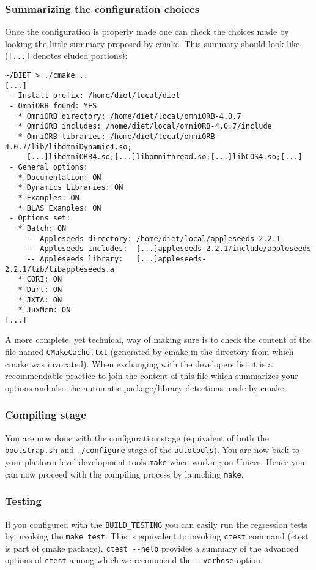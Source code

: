 \subsubsection{Summarizing the configuration choices}
Once the configuration is properly made one can check the choices made
by looking the little summary proposed by cmake.  This summary should
look like (\verb+[...]+ denotes eluded portions): {\footnotesize
\begin{verbatim}
~/DIET > ./cmake ..
[...]
 - Install prefix: /home/diet/local/diet
 - OmniORB found: YES
   * OmniORB directory: /home/diet/local/omniORB-4.0.7
   * OmniORB includes: /home/diet/local/omniORB-4.0.7/include
   * OmniORB libraries: /home/diet/local/omniORB-4.0.7/lib/libomniDynamic4.so;
     [...]libomniORB4.so;[...]libomnithread.so;[...]libCOS4.so;[...]
 - General options:
   * Documentation: ON
   * Dynamics Libraries: ON
   * Examples: ON
   * BLAS Examples: ON
 - Options set:
   * Batch: ON
     -- Appleseeds directory: /home/diet/local/appleseeds-2.2.1
     -- Appleseeds includes:  [...]appleseeds-2.2.1/include/appleseeds
     -- Appleseeds library:   [...]appleseeds-2.2.1/lib/libappleseeds.a
   * CORI: ON
   * Dart: ON
   * JXTA: ON
   * JuxMem: ON
[...]
\end{verbatim}
} A more complete, yet technical, way of making sure is to check the
content of the file named \verb+CMakeCache.txt+ (generated by cmake in
the directory from which cmake was invocated). When exchanging with
the developers list it is a recommendable practice to join the content
of this file which summarizes your options and also the automatic
package/library detections made by cmake.

\subsubsection{Compiling stage}
You are now done with the configuration stage (equivalent of both the
\verb+bootstrap.sh+ and \verb+./configure+ stage of the
\verb+autotools+).  You are now back to your platform level
development tools \ie \verb+make+ when working on Unices. Hence you
can now proceed with the compiling process by launching \verb+make+.

\subsubsection{Testing}
If you configured \diet with the \verb+BUILD_TESTING+ you can easily
run the regression tests by invoking the \verb+make test+. This is
equivalent to invoking \verb+ctest+ command (ctest is part of cmake
package). \verb+ctest --help+ provides a summary of the advanced
options of \verb+ctest+ among which we recommend the \verb+--verbose+
option.

